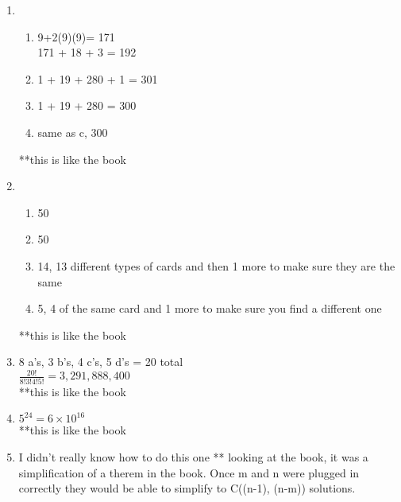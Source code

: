 \documentclass{article}
\begin{document}
\begin{enumerate}
  \item
    \begin{enumerate}
	\item 9+2(9)(9)= 171 \\
	      171 + 18 + 3 = 192
	\item 1 + 19 + 280 + 1 = 301
	\item 1 + 19 + 280 = 300
	\item same as c, 300
    \end{enumerate}
        **this is like the book
  \item
    \begin{enumerate}
      \item 50
      \item 50
      \item 14, 13 different types of cards and then 1 more to make sure they are the same
      \item 5, 4 of the same card and 1 more to make sure you find a different one
    \end{enumerate}
	**this is like the book

  \item 8 a's, 3 b's, 4 c's, 5 d's = 20 total \\
	$\frac{20!}{8!3!4!5!}=3,291,888,400$ \\
	**this is like the book

  \item $5^{24} = 6 \times  10^{16}$ \\
	**this is like the book

  \item I didn't really know how to do this one ** looking at the book, it was a simplification of a therem in the book.  Once m and n were plugged in correctly they would be able to simplify to C((n-1), (n-m)) solutions.

 

\end{enumerate}
\end{document}
